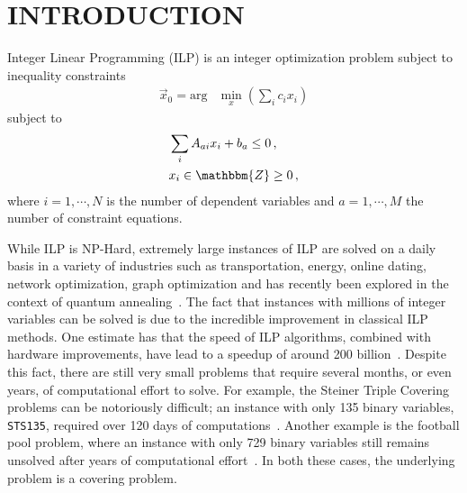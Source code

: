 \documentclass[10pt]{iopart}
\begin{document}

\maketitle

\flushbottom
\maketitle

\section{INTRODUCTION}
\label{sec:introduction}
Integer Linear Programming (ILP) is an integer optimization problem subject to inequality constraints
\begin{align}
 \label{eq:initial-ip-def}
 \vec x_0 = \mathrm{arg} & \min\limits_{x}\left(\sum_i c_i x_i\right)
\end{align}
subject to
\begin{align}
 \label{eq:ilp-constraints}
  & \sum_i A_{ai}x_i +b_a \leq 0 \,, \\
  & x_i  \in \mathbbm{Z} \geq 0\, ,
\end{align}
where $i=1, \cdots,  N$ is the number of dependent variables and $a=1, \cdots, M$ the number of constraint equations.

While ILP is NP-Hard, extremely large instances of ILP are solved on a daily basis in a variety of industries such as transportation, energy, online dating, network optimization, graph optimization and has recently been explored in the context of quantum annealing~\cite{2020arXiv200713788H}.
The fact that instances with millions of integer variables can be solved is due to the incredible improvement in classical ILP methods.
One estimate has that the speed of ILP algorithms, combined with hardware improvements, have lead to a speedup of around 200 billion~\cite{bertsimas2014statistics}.
Despite this fact, there are still very small problems that require several months, or even years, of computational effort to solve. For example, the Steiner Triple Covering problems can be notoriously difficult; an instance with only 135 binary variables, \texttt{STS135}, required over 120 days of computations~\cite{ostrowski2011solving}. Another example is the football pool problem, where an instance with only 729 binary variables still remains unsolved after years of computational effort~\cite{linderoth2009improving}.
In both these cases, the underlying problem is a covering problem.
\end{document}
